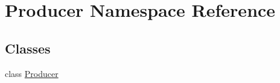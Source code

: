 \hypertarget{namespace_producer}{}\section{Producer Namespace Reference}
\label{namespace_producer}
\subsection*{Classes}
\begin{DoxyCompactItemize}
\item 
class \hyperlink{class_producer_1_1_producer}{Producer}
\end{DoxyCompactItemize}
